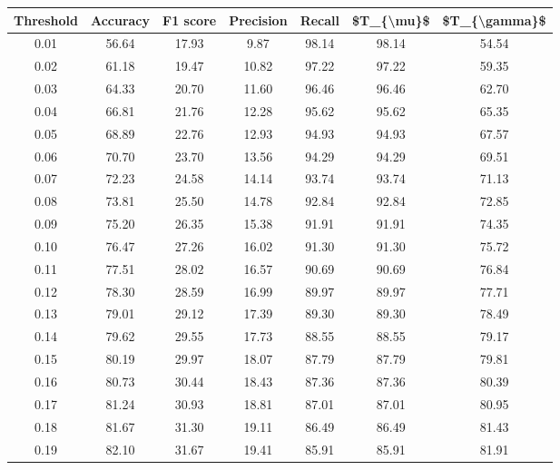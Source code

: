 \begin{tabular}{|c|c|c|c|c|c|c|}
\hline
 Threshold &  Accuracy &  F1 score &  Precision &  Recall &  \$T\_\{\textbackslash mu\}\$ &  \$T\_\{\textbackslash gamma\}\$ \\
\hline
      0.01 &     56.64 &     17.93 &       9.87 &   98.14 &      98.14 &         54.54 \\
      0.02 &     61.18 &     19.47 &      10.82 &   97.22 &      97.22 &         59.35 \\
      0.03 &     64.33 &     20.70 &      11.60 &   96.46 &      96.46 &         62.70 \\
      0.04 &     66.81 &     21.76 &      12.28 &   95.62 &      95.62 &         65.35 \\
      0.05 &     68.89 &     22.76 &      12.93 &   94.93 &      94.93 &         67.57 \\
      0.06 &     70.70 &     23.70 &      13.56 &   94.29 &      94.29 &         69.51 \\
      0.07 &     72.23 &     24.58 &      14.14 &   93.74 &      93.74 &         71.13 \\
      0.08 &     73.81 &     25.50 &      14.78 &   92.84 &      92.84 &         72.85 \\
      0.09 &     75.20 &     26.35 &      15.38 &   91.91 &      91.91 &         74.35 \\
      0.10 &     76.47 &     27.26 &      16.02 &   91.30 &      91.30 &         75.72 \\
      0.11 &     77.51 &     28.02 &      16.57 &   90.69 &      90.69 &         76.84 \\
      0.12 &     78.30 &     28.59 &      16.99 &   89.97 &      89.97 &         77.71 \\
      0.13 &     79.01 &     29.12 &      17.39 &   89.30 &      89.30 &         78.49 \\
      0.14 &     79.62 &     29.55 &      17.73 &   88.55 &      88.55 &         79.17 \\
      0.15 &     80.19 &     29.97 &      18.07 &   87.79 &      87.79 &         79.81 \\
      0.16 &     80.73 &     30.44 &      18.43 &   87.36 &      87.36 &         80.39 \\
      0.17 &     81.24 &     30.93 &      18.81 &   87.01 &      87.01 &         80.95 \\
      0.18 &     81.67 &     31.30 &      19.11 &   86.49 &      86.49 &         81.43 \\
      0.19 &     82.10 &     31.67 &      19.41 &   85.91 &      85.91 &         81.91 \\

\end{tabular}
